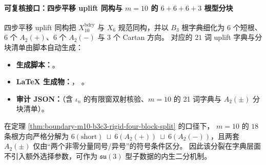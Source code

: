 \paragraph{可复核接口：四步平移 uplift 同构与 \texorpdfstring{$m=10$}{m=10} 的 \(6+6+6+3\) 根型分块}
四步平移 uplift 同构把 \(X_{10}^{\mathrm{bdry}}\) 与 \(X_6\) 规范同构，并以 \(B_3\) 根字典细化为
\(6\) 个短根、\(6\) 个 \(A_2(+)\)、\(6\) 个 \(A_2(-)\) 与 \(3\) 个 Cartan 方向。
对应的 \(21\) 词 uplift 字典与分块清单由脚本自动生成：
\begin{itemize}
  \item \textbf{生成脚本：}\texttt{}。
  \item \textbf{LaTeX 生成物：}\texttt{}，
  \texttt{}。
  \item \textbf{审计 JSON：}\texttt{}（含 \(\iota_n\) 的有限窗双射核验、\(m=10\) 的 21 词字典与 \(A_2(\pm)\) 分块清单）。
\end{itemize}

\begin{remark}\label{rem:boundary-m10-longroot-double-a2-sign-rigidity}
在定理 \ref{thm:boundary-m10-b3c3-rigid-four-block-split} 的口径下，
\(m=10\) 的 \(18\) 条根方向严格分解为
\(
6(\mathrm{short})\ \sqcup\ 6(A_2(+))\ \sqcup\ 6(A_2(-))
\)，且两套 \(A_2(\pm)\) 仅由“两个非零分量同号/异号”的符号条件区分。
因此该分裂在字典层面不引入额外选择参数，可作为 \(\mathfrak{su}(3)\) 型子数据的内生二分机制。
\end{remark}

